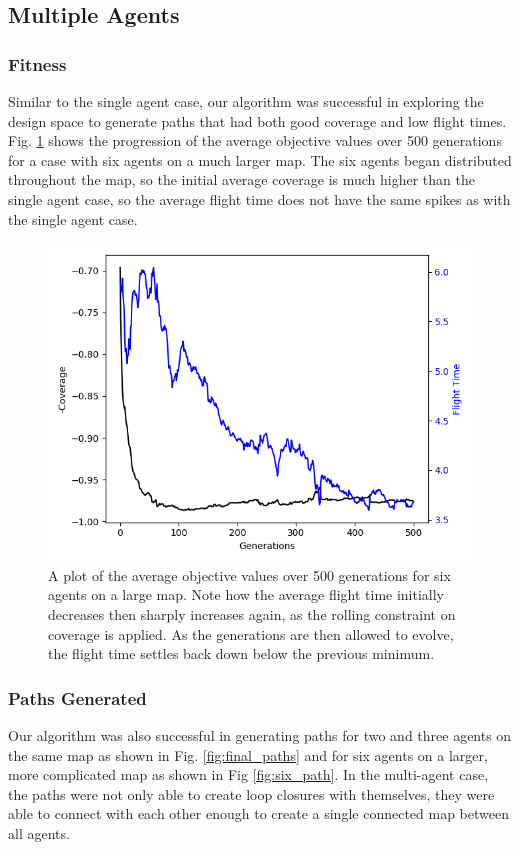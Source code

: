 \documentclass[letterpaper, 10 pt, conference]{ieeeconf}  %
\begin{document}
\subsection{Multiple Agents}
\subsubsection{Fitness}
Similar to the single agent case, our algorithm was successful in exploring the design space to generate paths that had both good coverage and low flight times. Fig. \ref{fig:multi_fitness} shows the progression of the average objective values over 500 generations for a case with six agents on a much larger map. The six agents began distributed throughout the map, so the initial average coverage is much higher than the single agent case, so the average flight time does not have the same spikes as with the single agent case.

\begin{figure}
\centering
\includegraphics[width=1.0\linewidth]{multi_agent_pareto_hist.png}
\caption[A plot of average objective values for six agents over generations in coverage planning optimization.]{A plot of the average objective values over 500 generations for six agents on a large map. Note how the average flight time initially decreases then sharply increases again, as the rolling constraint on coverage is applied. As the generations are then allowed to evolve, the flight time settles back down below the previous minimum.}
\label{fig:multi_fitness}
\end{figure}

\subsubsection{Paths Generated}
Our algorithm was also successful in generating paths for two and three agents on the same map as shown in Fig. \ref{fig:final_paths} and for six agents on a larger, more complicated map as shown in Fig \ref{fig:six_path}. In the multi-agent case, the paths were not only able to create loop closures with themselves, they were able to connect with each other enough to create a single connected map between all agents.
\end{document}

